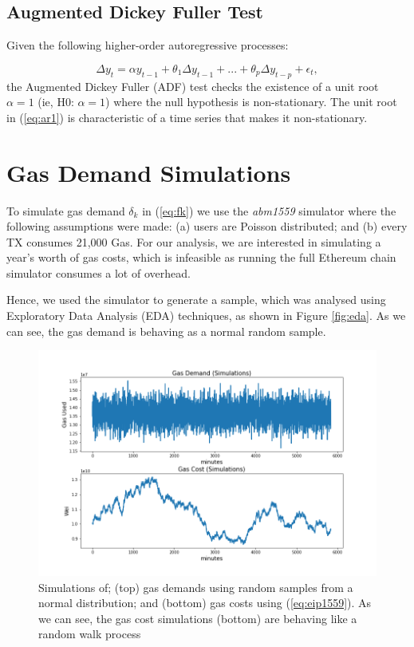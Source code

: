 \documentclass{article}
\begin{document}
\subsection{Augmented Dickey Fuller Test}
\label{section:adf}

Given the following higher-order autoregressive processes:

\begin{equation}
\Delta y_{t} = \alpha y_{t-1} + \theta_{1} \Delta y_{t-1}  + ... + \theta_{p} \Delta y_{t-p} + \epsilon_{t},
\label{eq:ar1} 
\end{equation}
the Augmented Dickey Fuller (ADF) test checks the existence of a unit root $\alpha = 1$ (ie, H0: $\alpha = 1$) where the null hypothesis is non-stationary. The unit root in (\ref{eq:ar1}) is characteristic of a time series that makes it non-stationary.


\section{Gas Demand Simulations}
\label{section:gas_demand}

To simulate gas demand $\delta_{k}$ in (\ref{eq:fk}) we use the \textit{abm1559}  simulator \cite{Mon21} where the following assumptions were made: (a) users are Poisson distributed; and (b) every TX consumes 21,000 Gas. For our analysis, we are interested in simulating a year's worth of gas costs, which is infeasible as running the full Ethereum chain simulator consumes a lot of overhead.

Hence, we used the simulator to generate a sample, which was analysed using Exploratory Data Analysis (EDA) techniques, as shown in Figure \ref{fig:eda}. As we can see, the gas demand is behaving as a normal random sample. 

\begin{figure}
\centering
\includegraphics[width=5in]{gas.png}
\caption{Simulations of; (top) gas demands using random samples from a normal distribution; and (bottom) gas costs using (\ref{eq:eip1559}). As we can see, the gas cost simulations (bottom) are behaving like a random walk process} 
\label{fig:gas}
\end{figure} 
\end{document}
